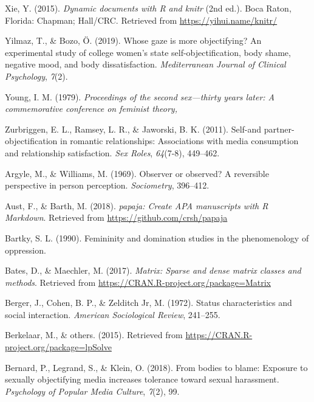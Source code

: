 \documentclass[
  man]{apa6}
\begin{document}
\leavevmode\hypertarget{ref-R-knitr}{}%
Xie, Y. (2015). \emph{Dynamic documents with R and knitr} (2nd ed.). Boca Raton, Florida: Chapman; Hall/CRC. Retrieved from \url{https://yihui.name/knitr/}

\leavevmode\hypertarget{ref-yilmaz2019whose}{}%
Yilmaz, T., \& Bozo, Ö. (2019). Whose gaze is more objectifying? An experimental study of college women's state self-objectification, body shame, negative mood, and body dissatisfaction. \emph{Mediterranean Journal of Clinical Psychology}, \emph{7}(2).

\leavevmode\hypertarget{ref-young1979}{}%
Young, I. M. (1979). \emph{Proceedings of the second sex---thirty years later: A commemorative conference on feminist theory,}

\leavevmode\hypertarget{ref-zurbriggen2011self}{}%
Zurbriggen, E. L., Ramsey, L. R., \& Jaworski, B. K. (2011). Self-and partner-objectification in romantic relationships: Associations with media consumption and relationship satisfaction. \emph{Sex Roles}, \emph{64}(7-8), 449--462.

\leavevmode\hypertarget{ref-argyle1969}{}%
Argyle, M., \& Williams, M. (1969). Observer or observed? A reversible perspective in person perception. \emph{Sociometry}, 396--412.

\leavevmode\hypertarget{ref-R-papaja}{}%
Aust, F., \& Barth, M. (2018). \emph{papaja: Create APA manuscripts with R Markdown}. Retrieved from \url{https://github.com/crsh/papaja}

\leavevmode\hypertarget{ref-Bartky}{}%
Bartky, S. L. (1990). Femininity and domination studies in the phenomenology of oppression.

\leavevmode\hypertarget{ref-R-Matrix}{}%
Bates, D., \& Maechler, M. (2017). \emph{Matrix: Sparse and dense matrix classes and methods}. Retrieved from \url{https://CRAN.R-project.org/package=Matrix}

\leavevmode\hypertarget{ref-berger1972}{}%
Berger, J., Cohen, B. P., \& Zelditch Jr, M. (1972). Status characteristics and social interaction. \emph{American Sociological Review}, 241--255.

\leavevmode\hypertarget{ref-R-lpSolve}{}%
Berkelaar, M., \& others. (2015). Retrieved from \url{https://CRAN.R-project.org/package=lpSolve}

\leavevmode\hypertarget{ref-bernard2018bodies}{}%
Bernard, P., Legrand, S., \& Klein, O. (2018). From bodies to blame: Exposure to sexually objectifying media increases tolerance toward sexual harassment. \emph{Psychology of Popular Media Culture}, \emph{7}(2), 99.
\end{document}
